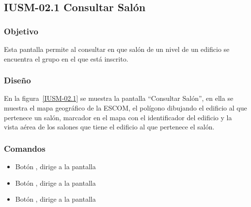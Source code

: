 \subsection{IUSM-02.1  Consultar  Salón}

\subsubsection{Objetivo}


Esta pantalla permite al  consultar en que salón de un nivel de un edificio se encuentra el grupo en el que está inscrito.
\subsubsection{Diseño}


En la figura~\ref{IUSM-02.1} se muestra la pantalla ``Consultar Salón'', en ella se muestra el mapa geográfico de la ESCOM, el polígono dibujando el edificio al que pertenece un salón, marcador en el mapa con el identificador del edificio  y la vista aérea  de los salones que tiene el edificio al que pertenece el salón.



\subsubsection{Comandos}
\begin{itemize}
	
	\item Botón \botInformacion, dirige a la pantalla 
	\item Botón , dirige a la pantalla 
		\item Botón , dirige a la pantalla  
\end{itemize}
